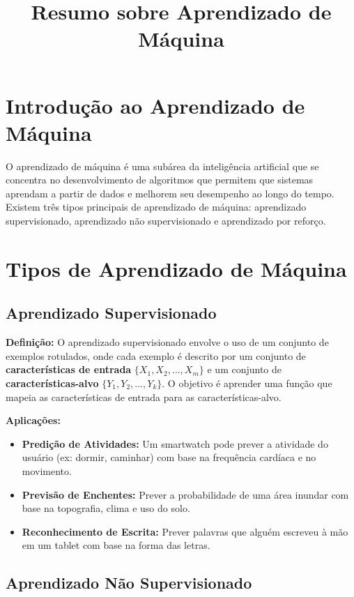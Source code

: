 \documentclass{article}
\title{Resumo sobre Aprendizado de Máquina}
\author{}
\date{}
\begin{document}
\maketitle

\section{Introdução ao Aprendizado de Máquina}

O aprendizado de máquina é uma subárea da inteligência artificial que se concentra no desenvolvimento de algoritmos que permitem que sistemas aprendam a partir de dados e melhorem seu desempenho ao longo do tempo. Existem três tipos principais de aprendizado de máquina: aprendizado supervisionado, aprendizado não supervisionado e aprendizado por reforço.

\section{Tipos de Aprendizado de Máquina}

\subsection{Aprendizado Supervisionado}

\textbf{Definição:} O aprendizado supervisionado envolve o uso de um conjunto de exemplos rotulados, onde cada exemplo é descrito por um conjunto de \textbf{características de entrada} $\{X_1, X_2, \dots, X_m\}$ e um conjunto de \textbf{características-alvo} $\{Y_1, Y_2, \dots, Y_k\}$. O objetivo é aprender uma função que mapeia as características de entrada para as características-alvo.

\textbf{Aplicações:}
\begin{itemize}
    \item \textbf{Predição de Atividades:} Um smartwatch pode prever a atividade do usuário (ex: dormir, caminhar) com base na frequência cardíaca e no movimento.
    \item \textbf{Previsão de Enchentes:} Prever a probabilidade de uma área inundar com base na topografia, clima e uso do solo.
    \item \textbf{Reconhecimento de Escrita:} Prever palavras que alguém escreveu à mão em um tablet com base na forma das letras.
\end{itemize}

\subsection{Aprendizado Não Supervisionado}
\end{document}
